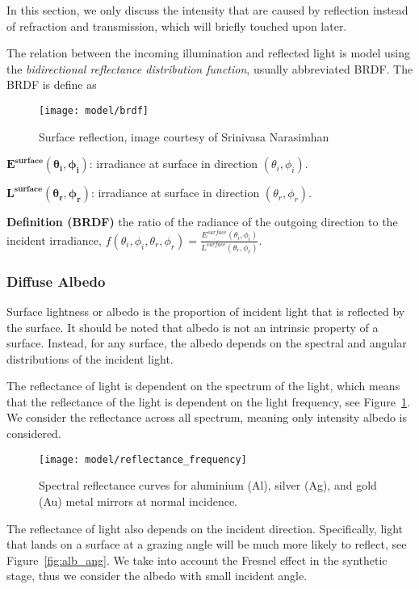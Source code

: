 In this section, we only discuss the intensity that are caused by reflection instead of refraction and transmission, which will briefly touched upon later.

The relation between the incoming illumination and reflected light is model using the \textit{bidirectional reflectance distribution function}, usually abbreviated BRDF. The BRDF is define as

\begin{figure}[h]
\centering
\texttt{[image: model/brdf]}
\caption{Surface reflection, image courtesy of Srinivasa Narasimhan}
\end{figure}

$\mathbf{E^{surface}(\theta_i, \phi_i)}$: irradiance at surface in direction $(\theta_i, \phi_i)$.

$\mathbf{L^{surface}(\theta_r, \phi_r)}$: irradiance at surface in direction $(\theta_r, \phi_r)$.

\textbf{Definition (BRDF)} the ratio of the radiance of the outgoing direction to the incident irradiance, \ie $f(\theta_i, \phi_i, \theta_r, \phi_r)=\frac{E^{surface}(\theta_i, \phi_i)}{L^{surface}(\theta_r, \phi_r)}$.

\subsubsection{Diffuse Albedo}
Surface lightness or albedo is the proportion of incident light that is reflected by the surface. It should be noted that albedo is not an intrinsic property of a surface. Instead, for any surface, the albedo depends on the spectral and angular distributions of the incident light. 

The reflectance of light is dependent on the spectrum of the light, which means that the reflectance of the light is dependent on the light frequency, see Figure~\ref{fig:alb_freq}. We consider the reflectance across all spectrum, meaning only intensity albedo is considered.

\begin{figure}[h]
\centering
\texttt{[image: model/reflectance\_frequency]}
\label{fig:alb_freq}
\caption{Spectral reflectance curves for aluminium (Al), silver (Ag), and gold (Au) metal mirrors at normal incidence.}
\end{figure}

The reflectance of light also depends on the incident direction. Specifically, light that lands on a surface at a grazing angle will be much more likely to reflect, see Figure~\ref{fig:alb_ang}. We take into account the Fresnel effect in the synthetic stage, thus we consider the albedo with small incident angle.

